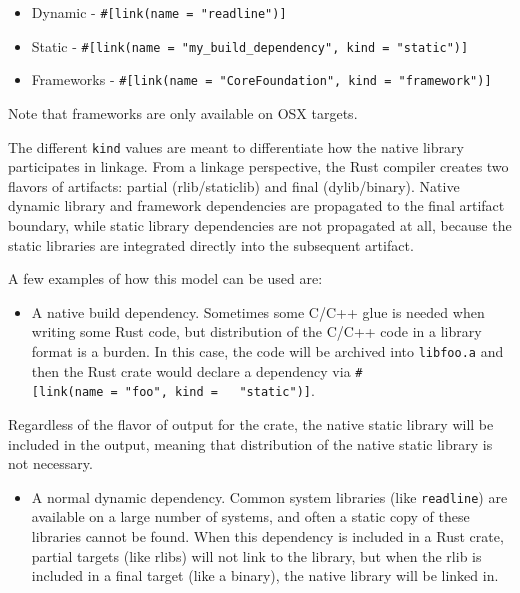\documentclass[a4paper,]{book}
\begin{document}
\begin{itemize}
\itemsep1pt\parskip0pt
\item
  Dynamic - \texttt{\#{[}link(name\ =\ "readline"){]}}
\item
  Static -
  \texttt{\#{[}link(name\ =\ "my\_build\_dependency",\ kind\ =\ "static"){]}}
\item
  Frameworks -
  \texttt{\#{[}link(name\ =\ "CoreFoundation",\ kind\ =\ "framework"){]}}
\end{itemize}

Note that frameworks are only available on OSX targets.

The different \texttt{kind} values are meant to differentiate how the
native library participates in linkage. From a linkage perspective, the
Rust compiler creates two flavors of artifacts: partial (rlib/staticlib)
and final (dylib/binary). Native dynamic library and framework
dependencies are propagated to the final artifact boundary, while static
library dependencies are not propagated at all, because the static
libraries are integrated directly into the subsequent artifact.

A few examples of how this model can be used are:

\begin{itemize}
\itemsep1pt\parskip0pt
\item
  A native build dependency. Sometimes some C/C++ glue is needed when
  writing some Rust code, but distribution of the C/C++ code in a
  library format is a burden. In this case, the code will be archived
  into \texttt{libfoo.a} and then the Rust crate would declare a
  dependency via
  \texttt{\#{[}link(name\ =\ "foo",\ kind\ =\ \ \ "static"){]}}.
\end{itemize}

Regardless of the flavor of output for the crate, the native static
library will be included in the output, meaning that distribution of the
native static library is not necessary.

\begin{itemize}
\itemsep1pt\parskip0pt
\item
  A normal dynamic dependency. Common system libraries (like
  \texttt{readline}) are available on a large number of systems, and
  often a static copy of these libraries cannot be found. When this
  dependency is included in a Rust crate, partial targets (like rlibs)
  will not link to the library, but when the rlib is included in a final
  target (like a binary), the native library will be linked in.
\end{itemize}
\end{document}
